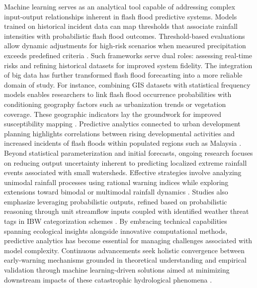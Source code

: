 Machine learning serves as an analytical tool capable of addressing complex input-output relationships inherent in flash flood predictive systems. Models trained on historical incident data can map thresholds that associate rainfall intensities with probabilistic flash flood outcomes. Threshold-based evaluations allow dynamic adjustments for high-risk scenarios when measured precipitation exceeds predefined criteria \citep{Msigwa2024}. Such frameworks serve dual roles: assessing real-time risks and refining historical datasets for improved system fidelity.
The integration of big data has further transformed flash flood forecasting into a more reliable domain of study. For instance, combining GIS datasets with statistical frequency models enables researchers to link flash flood occurrence probabilities with conditioning geography factors such as urbanization trends or vegetation coverage. These geographic indicators lay the groundwork for improved susceptibility mapping \citep{Hinge2024}. Predictive analytics connected to urban development planning highlights correlations between rising developmental activities and increased incidents of flash floods within populated regions such as Malaysia \citep{Saad2024}.
Beyond statistical parameterization and initial forecasts, ongoing research focuses on reducing output uncertainty inherent to predicting localized extreme rainfall events associated with small watersheds. Effective strategies involve analyzing unimodal rainfall processes using rational warning indices while exploring extensions toward bimodal or multimodal rainfall dynamics \citep{Yuan2019}. Studies also emphasize leveraging probabilistic outputs, refined based on probabilistic reasoning through unit streamflow inputs coupled with identified weather threat tags in IBW categorization schemes \citep{Martinaitis2023}.
By embracing technical capabilities spanning ecological insights alongside innovative computational methods, predictive analytics has become essential for managing challenges associated with model complexity. Continuous advancements seek holistic convergence between early-warning mechanisms grounded in theoretical understanding and empirical validation through machine learning-driven solutions aimed at minimizing downstream impacts of these catastrophic hydrological phenomena \citep{Maqtan2022b}.
